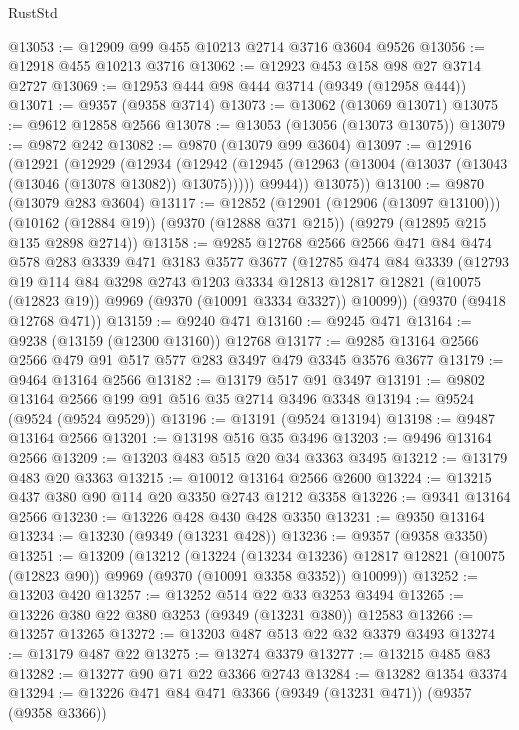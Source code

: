\begin{lexlean}{RustStd}
\begin{coremodule}
{\begin{coremodule}
{{{{{{{{{{{{{{{{{{{{{{{{{{{{{{{{{{{{{{{@13053 := @12909 @99 @455 @10213 @2714 @3716 @3604 @9526
@13056 := @12918 @455 @10213 @3716
@13062 := @12923 @453 @158 @98 @27 @3714 @2727
@13069 := @12953 @444 @98 @444 @3714 (@9349 (@12958 @444))
@13071 := @9357 (@9358 @3714)
@13073 := @13062 (@13069 @13071)
@13075 := @9612 @12858 @2566
@13078 := @13053 (@13056 (@13073 @13075))
@13079 := @9872 @242
@13082 := @9870 (@13079 @99 @3604)
@13097 := @12916
    (@12921
      (@12929
        (@12934
          (@12942
            (@12945 (@12963 (@13004 (@13037 (@13043 (@13046 (@13078 @13082)) @13075)))))
            @9944))
        @13075))
@13100 := @9870 (@13079 @283 @3604)
@13117 := @12852
    (@12901 (@12906 (@13097 @13100)))
    (@10162 (@12884 @19))
    (@9370 (@12888 @371 @215))
    (@9279 (@12895 @215 @135 @2898 @2714))
@13158 := @9285
    @12768
    @2566
    @2566
    @471
    @84
    @474
    @578
    @283
    @3339
    @471
    @3183
    @3577
    @3677
    (@12785
      @474
      @84
      @3339
      (@12793
        @19
        @114
        @84
        @3298
        @2743
        @1203
        @3334
        @12813
        @12817
        @12821
        (@10075 (@12823 @19))
        @9969
        (@9370 (@10091 @3334 @3327))
        @10099))
    (@9370 (@9418 @12768 @471))
@13159 := @9240 @471
@13160 := @9245 @471
@13164 := @9238 (@13159 (@12300 @13160)) @12768
@13177 := @9285 @13164 @2566 @2566 @479 @91 @517 @577 @283 @3497 @479 @3345 @3576 @3677
@13179 := @9464 @13164 @2566
@13182 := @13179 @517 @91 @3497
@13191 := @9802 @13164 @2566 @199 @91 @516 @35 @2714 @3496 @3348
@13194 := @9524 (@9524 (@9524 @9529))
@13196 := @13191 (@9524 @13194)
@13198 := @9487 @13164 @2566
@13201 := @13198 @516 @35 @3496
@13203 := @9496 @13164 @2566
@13209 := @13203 @483 @515 @20 @34 @3363 @3495
@13212 := @13179 @483 @20 @3363
@13215 := @10012 @13164 @2566 @2600
@13224 := @13215 @437 @380 @90 @114 @20 @3350 @2743 @1212 @3358
@13226 := @9341 @13164 @2566
@13230 := @13226 @428 @430 @428 @3350
@13231 := @9350 @13164
@13234 := @13230 (@9349 (@13231 @428))
@13236 := @9357 (@9358 @3350)
@13251 := @13209
    (@13212
      (@13224
        (@13234 @13236)
        @12817
        @12821
        (@10075 (@12823 @90))
        @9969
        (@9370 (@10091 @3358 @3352))
        @10099))
@13252 := @13203 @420
@13257 := @13252 @514 @22 @33 @3253 @3494
@13265 := @13226 @380 @22 @380 @3253 (@9349 (@13231 @380)) @12583
@13266 := @13257 @13265
@13272 := @13203 @487 @513 @22 @32 @3379 @3493
@13274 := @13179 @487 @22
@13275 := @13274 @3379
@13277 := @13215 @485 @83
@13282 := @13277 @90 @71 @22 @3366 @2743
@13284 := @13282 @1354 @3374
@13294 := @13226 @471 @84 @471 @3366 (@9349 (@13231 @471)) (@9357 (@9358 @3366))
}}}}}}}}}}}}}}}}}}}}}}}}}}}}}}}}}}}}}}}
\end{coremodule}}
\end{coremodule}
\end{lexlean}
